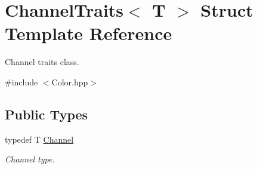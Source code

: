 \hypertarget{struct_d_o_1_1_channel_traits}{\section{Channel\-Traits$<$ T $>$ Struct Template Reference}
\label{struct_d_o_1_1_channel_traits}
}


Channel traits class.  




{\ttfamily \#include $<$Color.\-hpp$>$}

\subsection*{Public Types}
\begin{DoxyCompactItemize}
\item 
\hypertarget{struct_d_o_1_1_channel_traits_a90d968700fb94b368f5a5d1bc31f38e2}{typedef T \hyperlink{struct_d_o_1_1_channel_traits_a90d968700fb94b368f5a5d1bc31f38e2}{Channel}}\label{struct_d_o_1_1_channel_traits_a90d968700fb94b368f5a5d1bc31f38e2}

\begin{DoxyCompactList}\small\item\em Channel type. \end{DoxyCompactList}\end{DoxyCompactItemize}
